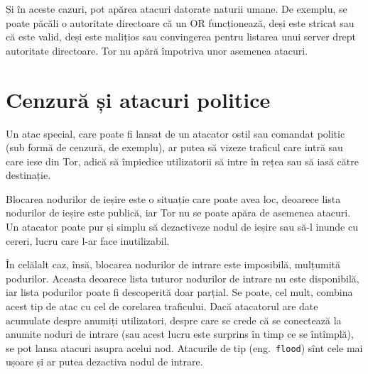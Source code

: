 Și în aceste cazuri, pot apărea atacuri datorate naturii umane. De exemplu,
se poate păcăli o autoritate directoare că un OR funcționează, deși este
stricat sau că este valid, deși este malițios sau convingerea pentru listarea unui
server drept autoritate directoare. Tor nu apără împotriva unor asemenea
atacuri.


\section{Cenzură și atacuri politice}
\indent\indent Un atac special, care poate fi lansat de un atacator
ostil sau comandat politic (sub formă de cenzură, de exemplu), ar putea
să vizeze traficul care intră sau care iese din Tor, adică să împiedice
utilizatorii să intre în rețea sau să iasă către destinație.

Blocarea nodurilor de ieșire este o situație care poate avea loc, deoarece
lista nodurilor de ieșire este publică, iar Tor nu se poate apăra de
asemenea atacuri. Un atacator poate pur și simplu să dezactiveze nodul
de ieșire sau să-l inunde cu cereri, lucru care l-ar face inutilizabil.

În celălalt caz, însă, blocarea nodurilor de intrare este imposibilă,
mulțumită podurilor. Aceasta deoarece lista tuturor nodurilor de intrare 
nu este disponibilă, iar lista podurilor poate fi descoperită doar parțial.
Se poate, cel mult, combina acest tip de atac cu cel de corelarea traficului.
Dacă atacatorul are date acumulate despre anumiți utilizatori, despre care
se crede că se conectează la anumite noduri de intrare (sau acest lucru este
surprins în timp ce se întîmplă), se pot lansa atacuri asupra acelui nod.
Atacurile de tip  (eng.\ \texttt{flood}) sînt cele mai ușoare
și ar putea dezactiva nodul de intrare.

